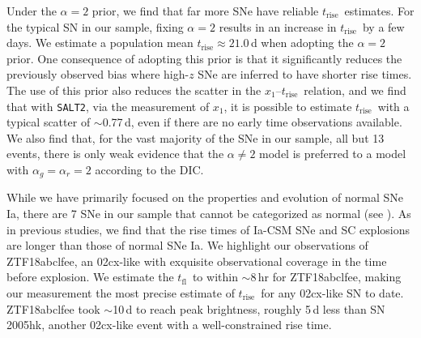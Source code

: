 \documentclass[twocolumn]{./aastex63}
\newcommand{\tfl}{$t_\mathrm{fl}$}
\newcommand{\trise}{$t_\mathrm{rise}$}
\begin{document}
Under the $\alpha = 2$ prior, we find that far more SNe have reliable \trise\
estimates. For the typical SN in our sample, fixing $\alpha = 2$ results in an
increase in \trise\ by a few days. We estimate a population mean \trise$
\approx 21.0$\,d when adopting the $\alpha = 2$ prior. One consequence of
adopting this prior is that it significantly reduces the previously observed
bias where high-$z$ SNe are inferred to have shorter rise times. The use of
this prior also reduces the scatter in the $x_1$--\trise\ relation, and we
find that with \texttt{SALT2}, via the measurement of $x_1$, it is possible to
estimate \trise\ with a typical scatter of $\sim$0.77\,d, even if there are no
early time observations available. We also find that, for the vast majority of
the SNe in our sample, all but 13 events, there is only weak evidence that the
$\alpha \ne 2$ model is preferred to a model with $\alpha_g = \alpha_r = 2$
according to the DIC.

While we have primarily focused on the properties and evolution of normal SNe
Ia, there are 7 SNe in our sample that cannot be categorized as normal (see
\citealt{Yao19}). As in previous studies, we find that the rise times of
Ia-CSM SNe and SC explosions are longer than those of normal SNe Ia. We
highlight our observations of ZTF18abclfee, an 02cx-like with exquisite
observational coverage in the time before explosion. We estimate the \tfl\ to
within $\sim$8\,hr for ZTF18abclfee, making our measurement the most precise
estimate of \trise\ for any 02cx-like SN to date. ZTF18abclfee took
$\sim$10\,d to reach peak brightness, roughly 5\,d less than SN\,2005hk,
another 02cx-like event with a well-constrained rise time.
\end{document}
